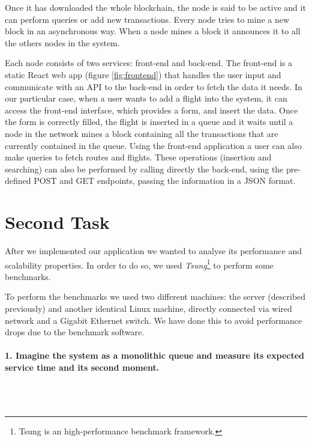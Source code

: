 \documentclass[11pt]{scrartcl} %
\begin{document}
Once it has downloaded the whole blockchain, the node is said to be active and it can perform queries or add new transactions. Every node tries to mine a new block in an asynchronous way. When a node mines a block it announces it to all the others nodes in the system.

Each node consists of two services: front-end and back-end. The front-end is a static React web app (figure \ref{fig:frontend}) that handles the user input and communicate with an API to the back-end in order to fetch the data it needs. In our particular case, when a user wants to add a flight into the system, it can access the front-end interface, which provides a form, and insert the data. Once the form is correctly filled, the flight is inserted in a queue and it waits until a node in the network mines a block containing all the transactions that are currently contained in the queue. Using the front-end application a user can also make queries to fetch routes and flights. These operations (insertion and searching) can also be performed by calling directly the back-end, using the pre-defined POST and GET endpoints, passing the information in a JSON format.

\section{Second Task}

After we implemented our application we wanted to analyse its performance and scalability properties. In order to do so, we used \textit{Tsung}\footnote{Tsung is an high-performance benchmark framework.} to perform some benchmarks.

To perform the benchmarks we used two different machines: the server (described previously) and another identical Linux machine, directly connected via wired network and a Gigabit Ethernet switch. We have done this to avoid performance drops due to the benchmark software.




\paragraph*{1. Imagine the system as a monolithic queue and measure its expected service time and its second moment.} \mbox{}\\\\ 
\end{document}
